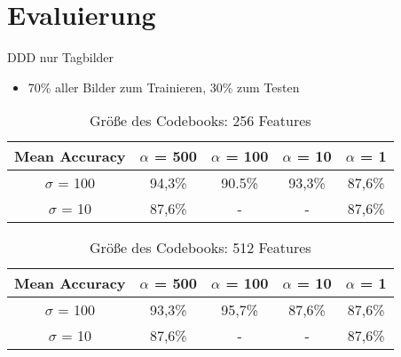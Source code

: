 \section{Evaluierung}
\begin{frame}[t,fragile]{DDD nur Tagbilder}
\begin{itemize}
	\item 70\% aller Bilder zum Trainieren, 30\% zum Testen
\end{itemize}
	\begin{table}
		\begin{tabular}{|c||c|c|c|c|}
			\hline
			Mean Accuracy & $\alpha$ = 500 & $\alpha$ = 100 & $\alpha$ = 10 & $\alpha$ = 1 \\
			\hline
			$\sigma$ = 100 & 94,3\% & 90.5\% & 93,3\% & 87,6\% \\ 
			\hline
			$\sigma$ = 10 & 87,6\% & - & - & 87,6\% \\
			\hline
		\end{tabular}
	\caption{Größe des Codebooks: 256 Features}
	\end{table}
		\begin{table}
		\begin{tabular}{|c||c|c|c|c|}
			\hline
			Mean Accuracy & $\alpha$ = 500 & $\alpha$ = 100 & $\alpha$ = 10 & $\alpha$ = 1 \\
			\hline
			$\sigma$ = 100 & 93,3\% & 95,7\% & 87,6\% & 87,6\% \\ 
			\hline
			$\sigma$ = 10 & 87,6\% & - & - & 87,6\% \\
			\hline
		\end{tabular}
		\caption{Größe des Codebooks: 512 Features}
	\end{table}
\end{frame}

